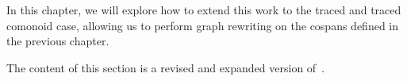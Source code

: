 In this chapter, we will explore how to extend this work to the traced and
traced comonoid case, allowing us to perform graph rewriting on the cospans
defined in the previous chapter.

\begin{remark}
    The content of this section is a revised and expanded version
    of~\cite[Sec. 5]{ghica2023rewriting}.
\end{remark}




